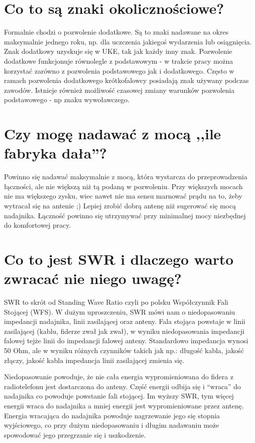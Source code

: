 \documentclass[a4paper,12pt]{article}
\begin{document}
\section{Co to są znaki okolicznościowe?}
Formalnie chodzi o pozwolenie dodatkowe. Są to znaki nadawane na okres maksymalnie jednego roku, np. dla uczczenia jakiegoś wydarzenia lub osiągnięcia. Znak dodatkowy uzyskuje się w UKE, tak jak każdy inny znak. Pozwolenie dodatkowe funkcjonuje równolegle z podstawowym - w trakcie pracy można korzystać zarówno z pozwolenia podstawowego jak i dodatkowego. Często w ramach pozwolenia dodatkowego krótkofalowcy posiadają znak używany podczas zawodów. Istnieje również możliwość czasowej zmiany warunków pozwolenia podstawowego - np znaku wywoławczego. 

\section{Czy mogę nadawać z mocą ,,ile fabryka dała''?}
Powinno się nadawać maksymalnie z mocą, która wystarcza do przeprowadzenia łączności, ale nie większą niż tą podaną w pozwoleniu. Przy większych mocach nie ma większego zysku, wiec nawet nie ma sensu marnować prądu na to, żeby wytracał się na antenie ;) Lepiej zrobić dobrą antenę niż sugerować się mocą nadajnika.
Łączność powinno się utrzymywać przy minimalnej mocy niezbędnej do komfortowej pracy. 

\section{Co to jest SWR i dlaczego warto zwracać nie niego uwagę?}
SWR to skrót od Standing Wave Ratio czyli po polsku Współczynnik Fali Stojącej (WFS). W dużym uproszczeniu, SWR mówi nam o niedopasowaniu impedancji nadajnika, linii zasilającej oraz anteny. Fala stojąca powstaje w linii zasilającej (kablu, fiderze zwał jak zwał), w wyniku niedopasowania impedancji falowej tejże linii do impedancji falowej anteny. Standardowo impedancja wynosi 50 Ohm, ale w wyniku różnych czynników takich jak np.: długość kabla, jakość złączy, jakość kabla impedancja linii zasilającej zmienia się. 

Niedopasowanie powoduje, że nie cała energia wypromieniowana do fidera z radiotelefonu jest dostarczona do anteny. Część energii odbija się i “wraca” do nadajnika co powoduje powstanie fali stojącej. Im wyższy SWR, tym więcej energii wraca do nadajnika a mniej energii jest wypromieniowane przez antenę. Energia wracająca do nadajnika powoduje nagrzewanie jego się stopnia wyjściowego, co przy dużym niedopasowaniu i długim nadawaniu może spowodować jego przegrzanie się i uszkodzenie.
\end{document}
